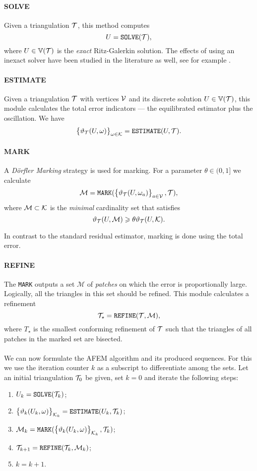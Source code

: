 \documentclass[thesis.tex]{subfiles}
\begin{document}
\paragraph{SOLVE}Given a triangulation $\mathcal{T}$, this method computes
\[
  U = \texttt{SOLVE}(\mathcal{T}),
\]
where $U \in \mathbb{V}(\mathcal{T})$ is the \emph{exact} Ritz-Galerkin solution. The effects of using an inexact solver have
been studied in the literature as well, see for example \cite[\S7]{carstensen2014axioms}.
\paragraph{ESTIMATE} Given a triangulation $\mathcal{T}$ with vertices $\mathcal{V}$ and its discrete solution $U \in \mathbb{V}(\mathcal{T})$, this module 
calculates the total error indicators --- the equilibrated estimator plus the oscillation. We have
\[
  \set{\vartheta_{\mathcal{T}}(U, \omega)}_{\omega \in \mathcal{K}} = \texttt{ESTIMATE}(U, \mathcal{T}).
\]
\paragraph{MARK}
A \emph{D\"orfler Marking} strategy is used for marking. For a parameter $\theta \in (0,1]$ we calculate
\[
  \mathcal{M} = \texttt{MARK}( \set{\vartheta_{\mathcal{T}}(U, \omega_a)}_{a \in \mathcal{V}}, \mathcal{T}),
\]
where $\mathcal{M} \subset \mathcal{K}$ is the \emph{minimal} cardinality set that satisfies
\[
  \vartheta_{\mathcal{T}}(U,\mathcal{M}) \geqslant \theta \vartheta_{\mathcal{T}}(U, \mathcal{K}).
\]
\begin{rem}
  In contrast to the standard residual estimator, marking is done using the total error.
\end{rem}
\paragraph{REFINE}
The \texttt{MARK} outputs a set $\mathcal{M}$ of \emph{patches} on which the error is proportionally large. 
Logically, all the triangles in this set should be refined. This module calculates a refinement
\[
  \mathcal{T}_\star = \texttt{REFINE}(\mathcal{T}, \mathcal{M}),
\]
where $T_\star$ is the smallest conforming refinement of $\mathcal{T}$ such that the triangles of
all patches in the marked set are bisected.
\\\\
We can now formulate the AFEM algorithm and its produced sequences. For this we use the
iteration counter $k$ as a subscript to differentiate among the sets.
Let an initial triangulation $\mathcal{T}_0$ be given, set $k = 0$ and iterate the following steps:
\begin{enumerate}
\item $U_k = \texttt{SOLVE}(\mathcal{T}_k)$;
\item $\set{\vartheta_k(U_k, \omega)}_{\mathcal{K}_k} = \texttt{ESTIMATE}(U_k, \mathcal{T}_k)$;
  \item $\mathcal{M}_k = \texttt{MARK}(\set{\vartheta_k(U_k, \omega)}_{\mathcal{K}_k}, \mathcal{T}_k)$;
  \item $\mathcal{T}_{k+1} = \texttt{REFINE}(\mathcal{T}_k, \mathcal{M}_k)$;
  \item $k  = k + 1$.
\end{enumerate}
\end{document}
